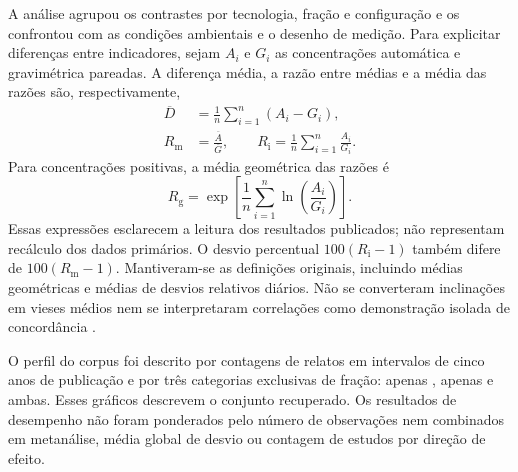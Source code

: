 A análise agrupou os contrastes por tecnologia, fração e configuração e os confrontou com as condições ambientais e o desenho de medição. Para explicitar diferenças entre indicadores, sejam $A_i$ e $G_i$ as concentrações automática e gravimétrica pareadas. A diferença média, a razão entre médias e a média das razões são, respectivamente,
\begin{align}
\overline{D}&=\frac{1}{n}\sum_{i=1}^{n}(A_i-G_i),\label{eq:diferenca}\\
R_{\mathrm{m}}&=\frac{\overline{A}}{\overline{G}},\qquad
R_{\mathrm{i}}=\frac{1}{n}\sum_{i=1}^{n}\frac{A_i}{G_i}.\label{eq:razoes}
\end{align}
Para concentrações positivas, a média geométrica das razões é
\begin{equation}
R_{\mathrm{g}}=\exp\left[\frac{1}{n}\sum_{i=1}^{n}
\ln\left(\frac{A_i}{G_i}\right)\right].\label{eq:geometrica}
\end{equation}
Essas expressões esclarecem a leitura dos resultados publicados; não representam recálculo dos dados primários. O desvio percentual $100(R_{\mathrm{i}}-1)$ também difere de $100(R_{\mathrm{m}}-1)$. Mantiveram-se as definições originais, incluindo médias geométricas e médias de desvios relativos diários. Não se converteram inclinações em vieses médios nem se interpretaram correlações como demonstração isolada de concordância \parencite{bland1986}.

O perfil do corpus foi descrito por contagens de relatos em intervalos de cinco anos de publicação e por três categorias exclusivas de fração: apenas \MPdoiscinco{}, apenas \MPdez{} e ambas. Esses gráficos descrevem o conjunto recuperado. Os resultados de desempenho não foram ponderados pelo número de observações nem combinados em metanálise, média global de desvio ou contagem de estudos por direção de efeito.


